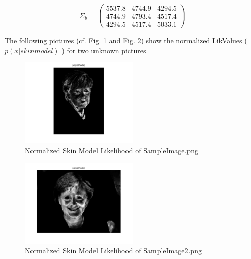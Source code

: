 \documentclass[conference]{IEEEtran}
\begin{document}
\begin{compactenum}[a)]
$$
\Sigma_b =
 \begin{pmatrix}
    5537.8  &  4744.9  &  4294.5 \\
    4744.9  &  4793.4  &  4517.4 \\
    4294.5  &  4517.4  &  5033.1
 \end{pmatrix}
$$
\newpage
\item The following pictures (cf. Fig. \ref{fig:skin1} and Fig. \ref{fig:skin2}) show the normalized LikValues ( $p(x \vert skin model)$ ) for two unknown pictures
\begin{figure}[h!]
  	\centering
    \includegraphics[width=0.5\textwidth]{img/SampleImage-skin.png}
    \caption{Normalized Skin Model Likelihood of SampleImage.png}
    \label{fig:skin1}
\end{figure}
\begin{figure}[h!]
  	\centering
    \includegraphics[width=0.5\textwidth]{img/SampleImage2-skin.png}
    \caption{Normalized Skin Model Likelihood of SampleImage2.png}
    \label{fig:skin2}
\end{figure}


\end{compactenum}
\end{document}
